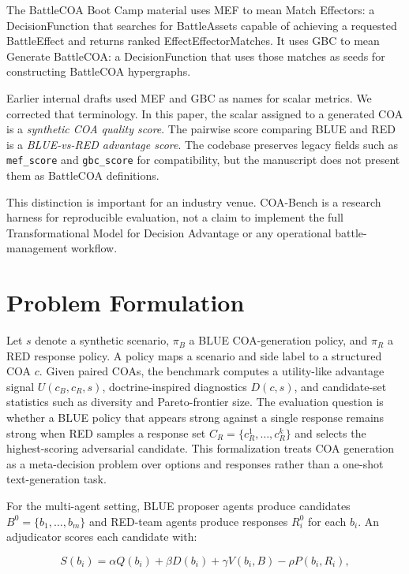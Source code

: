 \documentclass[sigconf]{acmart}
\begin{document}
The BattleCOA Boot Camp material uses MEF to mean Match Effectors: a DecisionFunction that searches for BattleAssets capable of achieving a requested BattleEffect and returns ranked EffectEffectorMatches. It uses GBC to mean Generate BattleCOA: a DecisionFunction that uses those matches as seeds for constructing BattleCOA hypergraphs.

Earlier internal drafts used MEF and GBC as names for scalar metrics. We corrected that terminology. In this paper, the scalar assigned to a generated COA is a \emph{synthetic COA quality score}. The pairwise score comparing BLUE and RED is a \emph{BLUE-vs-RED advantage score}. The codebase preserves legacy fields such as \texttt{mef\_score} and \texttt{gbc\_score} for compatibility, but the manuscript does not present them as BattleCOA definitions.

This distinction is important for an industry venue. COA-Bench is a research harness for reproducible evaluation, not a claim to implement the full Transformational Model for Decision Advantage or any operational battle-management workflow.

\section{Problem Formulation}

Let $s$ denote a synthetic scenario, $\pi_B$ a BLUE COA-generation policy, and $\pi_R$ a RED response policy. A policy maps a scenario and side label to a structured COA $c$. Given paired COAs, the benchmark computes a utility-like advantage signal $U(c_B,c_R,s)$, doctrine-inspired diagnostics $D(c,s)$, and candidate-set statistics such as diversity and Pareto-frontier size. The evaluation question is whether a BLUE policy that appears strong against a single response remains strong when RED samples a response set $C_R=\{c_R^1,\ldots,c_R^k\}$ and selects the highest-scoring adversarial candidate. This formalization treats COA generation as a meta-decision problem over options and responses rather than a one-shot text-generation task.

For the multi-agent setting, BLUE proposer agents produce candidates $B^0=\{b_1,\ldots,b_m\}$ and RED-team agents produce responses $R_i^0$ for each $b_i$. An adjudicator scores each candidate with:

\begin{equation}
S(b_i) = \alpha Q(b_i)+\beta D(b_i)+\gamma V(b_i,B)-\rho P(b_i,R_i),
\end{equation}
\end{document}

